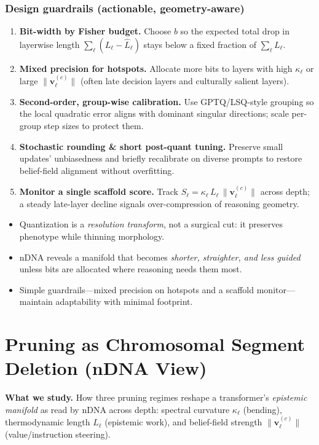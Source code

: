 \subsubsection*{Design guardrails (actionable, geometry-aware)}
\begin{enumerate}[leftmargin=1.2em]
\item \textbf{Bit-width by Fisher budget.} Choose $b$ so the expected total drop in layerwise length $\sum_\ell (L_\ell-\widehat L_\ell)$ stays below a fixed fraction of $\sum_\ell L_\ell$.
\item \textbf{Mixed precision for hotspots.} Allocate more bits to layers with high $\kappa_\ell$ or large $\|\mathbf v^{(c)}_\ell\|$ (often late decision layers and culturally salient layers).
\item \textbf{Second-order, group-wise calibration.} Use GPTQ/LSQ-style grouping so the local quadratic error aligns with dominant singular directions; scale per-group step sizes to protect them.
\item \textbf{Stochastic rounding \& short post-quant tuning.} Preserve small updates’ unbiasedness and briefly recalibrate on diverse prompts to restore belief-field alignment without overfitting.
\item \textbf{Monitor a single scaffold score.} Track $S_\ell=\kappa_\ell\,L_\ell\,\|\mathbf v^{(c)}_\ell\|$ across depth; a steady late-layer decline signals over-compression of reasoning geometry.
\end{enumerate}

\begin{tcolorbox}[colback=black!3,colframe=black!40,title=\textbf{Key takeaways}]
\begin{itemize}[leftmargin=1.2em]
\item Quantization is a \emph{resolution transform}, not a surgical cut: it preserves phenotype while thinning morphology.
\item nDNA reveals a manifold that becomes \emph{shorter, straighter, and less guided} unless bits are allocated where reasoning needs them most.
\item Simple guardrails—mixed precision on hotspots and a scaffold monitor—maintain adaptability with minimal footprint.
\end{itemize}
\end{tcolorbox}


\clearpage
\newpage

\section*{Pruning as Chromosomal Segment Deletion (nDNA View)}
\noindent\textbf{What we study.} How three pruning regimes reshape a transformer's \emph{epistemic manifold} as read by nDNA across depth: spectral curvature $\kappa_\ell$ (bending), thermodynamic length $L_\ell$ (epistemic work), and belief-field strength $\|\mathbf v^{(c)}_\ell\|$ (value/instruction steering).

